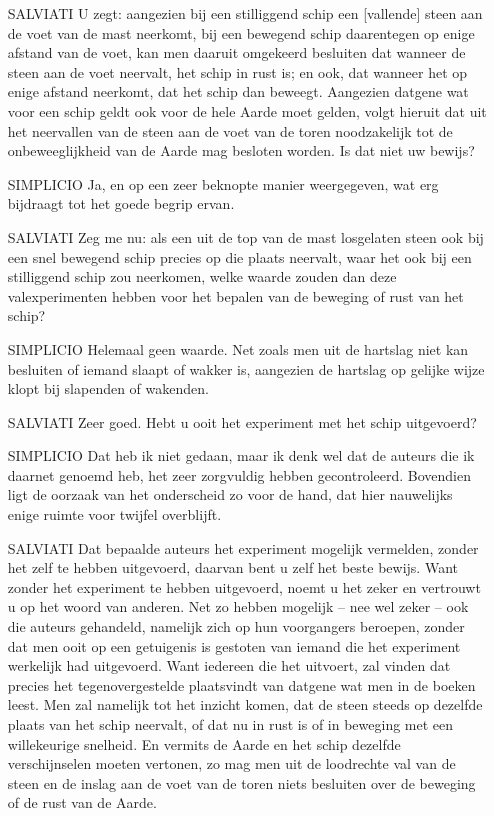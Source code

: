 \documentclass{ximera}
\begin{document}
	{\footnotesize
	
	\begin{enumerate}
	\item[SALVIATI]U zegt: aangezien bij een stilliggend schip een [vallende] steen aan de voet van de mast neerkomt, bij een bewegend schip daarentegen op enige afstand van de voet, kan men daaruit omgekeerd besluiten dat wanneer de steen aan de voet neervalt, het schip in rust is; en ook, dat wanneer het op enige afstand neerkomt, dat het schip dan beweegt. Aangezien datgene wat voor een schip geldt ook voor de hele Aarde moet gelden, volgt hieruit dat uit het neervallen van de steen aan de voet van de toren noodzakelijk tot de onbeweeglijkheid van de Aarde mag besloten worden. Is dat niet uw bewijs?
	\item[SIMPLICIO]Ja, en op een zeer beknopte manier weergegeven, wat erg bijdraagt tot het goede begrip ervan.
	\item[SALVIATI]Zeg me nu: als een uit de top van de mast losgelaten steen ook bij een snel bewegend schip precies op die plaats neervalt, waar het ook bij een stilliggend schip zou neerkomen, welke waarde zouden dan deze valexperimenten hebben voor het bepalen van de beweging of rust van het schip?
	\item[SIMPLICIO]Helemaal geen waarde. Net zoals men uit de hartslag niet kan besluiten of iemand slaapt of wakker is, aangezien de hartslag op gelijke wijze klopt bij slapenden of wakenden.
	\item[SALVIATI]Zeer goed. Hebt u ooit het experiment met het schip uitgevoerd?
	\item[SIMPLICIO]Dat heb ik niet gedaan, maar ik denk wel dat de auteurs die ik daarnet genoemd heb, het zeer zorgvuldig hebben gecontroleerd. Bovendien ligt de oorzaak van het onderscheid zo voor de hand, dat hier nauwelijks enige ruimte voor twijfel overblijft.
	\item[SALVIATI]Dat bepaalde auteurs het experiment mogelijk vermelden, zonder het zelf te hebben uitgevoerd, daarvan bent u zelf het beste bewijs. Want zonder het experiment te hebben uitgevoerd, noemt u het zeker en vertrouwt u op het woord van anderen. Net zo hebben mogelijk -- nee wel zeker -- ook die auteurs gehandeld, namelijk zich op hun voorgangers beroepen, zonder dat men ooit op een getuigenis is gestoten van iemand die het experiment werkelijk had uitgevoerd. Want iedereen die het uitvoert, zal vinden dat precies het tegenovergestelde plaatsvindt van datgene wat men in de boeken leest. Men zal namelijk tot het inzicht komen, dat de steen steeds op dezelfde plaats van het schip neervalt, of dat nu in rust is of in beweging met een willekeurige snelheid. En vermits de Aarde en het schip dezelfde verschijnselen moeten vertonen, zo mag men uit de loodrechte val van de steen en de inslag aan de voet van de toren niets besluiten over de beweging of de rust van de Aarde.

\end{enumerate}}
\end{document}
